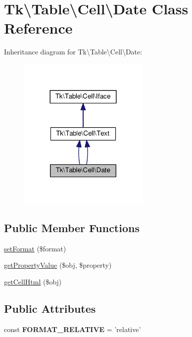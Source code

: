 \hypertarget{classTk_1_1Table_1_1Cell_1_1Date}{\section{Tk\textbackslash{}Table\textbackslash{}Cell\textbackslash{}Date Class Reference}
\label{classTk_1_1Table_1_1Cell_1_1Date}
}


Inheritance diagram for Tk\textbackslash{}Table\textbackslash{}Cell\textbackslash{}Date\+:\nopagebreak
\begin{figure}[H]
\begin{center}
\leavevmode
\includegraphics[width=180pt]{classTk_1_1Table_1_1Cell_1_1Date__inherit__graph}
\end{center}
\end{figure}
\subsection*{Public Member Functions}
\begin{DoxyCompactItemize}
\item 
\hyperlink{classTk_1_1Table_1_1Cell_1_1Date_a3187a53a6f025a9e04b8fca7d90ab97c}{set\+Format} (\$format)
\item 
\hyperlink{classTk_1_1Table_1_1Cell_1_1Date_afda49cc998bf4d98de6879a60359ab88}{get\+Property\+Value} (\$obj, \$property)
\item 
\hyperlink{classTk_1_1Table_1_1Cell_1_1Date_aebc9d2c9ccbddbf992139a3d163b65b2}{get\+Cell\+Html} (\$obj)
\end{DoxyCompactItemize}
\subsection*{Public Attributes}
\begin{DoxyCompactItemize}
\item 
\hypertarget{classTk_1_1Table_1_1Cell_1_1Date_a10db1c17bccbe75882eb265aa5453ada}{const {\bfseries F\+O\+R\+M\+A\+T\+\_\+\+R\+E\+L\+A\+T\+I\+V\+E} = 'relative'}\label{classTk_1_1Table_1_1Cell_1_1Date_a10db1c17bccbe75882eb265aa5453ada}

\end{DoxyCompactItemize}
